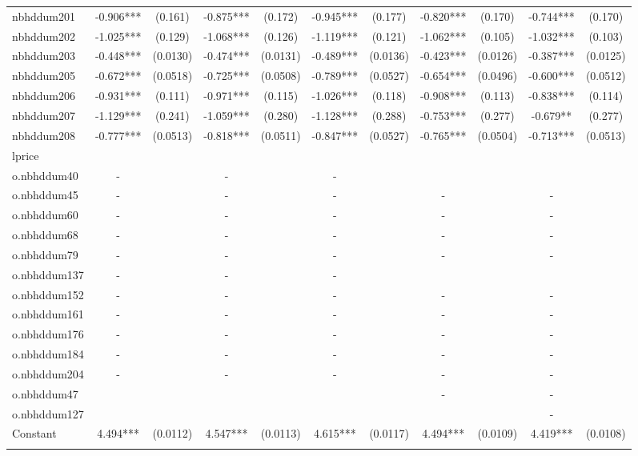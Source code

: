 \documentclass[]{article}
\begin{document}
\begin{tabular}{lcccccccccc}
nbhddum201 & -0.906*** & (0.161) & -0.875*** & (0.172) & -0.945*** & (0.177) & -0.820*** & (0.170) & -0.744*** & (0.170) \\
nbhddum202 & -1.025*** & (0.129) & -1.068*** & (0.126) & -1.119*** & (0.121) & -1.062*** & (0.105) & -1.032*** & (0.103) \\
nbhddum203 & -0.448*** & (0.0130) & -0.474*** & (0.0131) & -0.489*** & (0.0136) & -0.423*** & (0.0126) & -0.387*** & (0.0125) \\
nbhddum205 & -0.672*** & (0.0518) & -0.725*** & (0.0508) & -0.789*** & (0.0527) & -0.654*** & (0.0496) & -0.600*** & (0.0512) \\
nbhddum206 & -0.931*** & (0.111) & -0.971*** & (0.115) & -1.026*** & (0.118) & -0.908*** & (0.113) & -0.838*** & (0.114) \\
nbhddum207 & -1.129*** & (0.241) & -1.059*** & (0.280) & -1.128*** & (0.288) & -0.753*** & (0.277) & -0.679** & (0.277) \\
nbhddum208 & -0.777*** & (0.0513) & -0.818*** & (0.0511) & -0.847*** & (0.0527) & -0.765*** & (0.0504) & -0.713*** & (0.0513) \\
lprice &  &  &  &  &  &  &  &  &  &  \\
o.nbhddum40 & - &  & - &  & - &  &  &  &  &  \\
o.nbhddum45 & - &  & - &  & - &  & - &  & - &  \\
o.nbhddum60 & - &  & - &  & - &  & - &  & - &  \\
o.nbhddum68 & - &  & - &  & - &  & - &  & - &  \\
o.nbhddum79 & - &  & - &  & - &  & - &  & - &  \\
o.nbhddum137 & - &  & - &  & - &  &  &  &  &  \\
o.nbhddum152 & - &  & - &  & - &  & - &  & - &  \\
o.nbhddum161 & - &  & - &  & - &  & - &  & - &  \\
o.nbhddum176 & - &  & - &  & - &  & - &  & - &  \\
o.nbhddum184 & - &  & - &  & - &  & - &  & - &  \\
o.nbhddum204 & - &  & - &  & - &  & - &  & - &  \\
o.nbhddum47 &  &  &  &  &  &  & - &  & - &  \\
o.nbhddum127 &  &  &  &  &  &  &  &  & - &  \\
Constant & 4.494*** & (0.0112) & 4.547*** & (0.0113) & 4.615*** & (0.0117) & 4.494*** & (0.0109) & 4.419*** & (0.0108) \\
 &  &  &  &  &  &  &  &  &  &  \\

\end{tabular}
\end{document}
